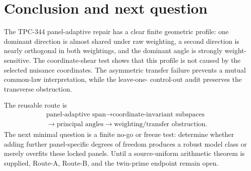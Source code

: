 \documentclass[11pt]{article}
\begin{document}
\section{Conclusion and next question}

The TPC-344 panel-adaptive repair has a clear finite geometric profile: one
dominant direction is almost shared under raw weighting, a second direction
is nearly orthogonal in both weightings, and the dominant angle is strongly
weight-sensitive.  The coordinate-shear test shows that this profile is not
caused by the selected nuisance coordinates.  The asymmetric transfer
failure prevents a mutual common-law interpretation, while the leave-one-
control-out audit preserves the transverse obstruction.

The reusable route is
\[
\begin{gathered}
\text{panel-adaptive span}\longrightarrow
\text{coordinate-invariant subspaces}\\
\longrightarrow\text{principal angles}\longrightarrow
\text{weighting/transfer obstruction}.
\end{gathered}
\]
The next minimal question is a finite no-go or freeze test: determine whether
adding further panel-specific degrees of freedom produces a robust model
class or merely overfits these locked panels.  Until a source-uniform
arithmetic theorem is supplied, Route-A, Route-B, and the twin-prime endpoint
remain open.
\end{document}
